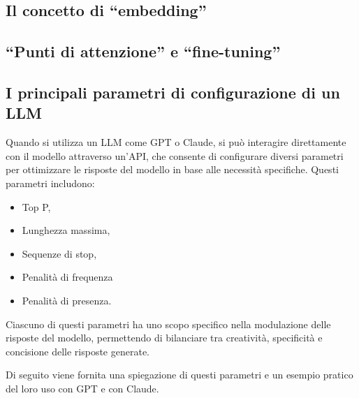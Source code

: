     \subsection{Il concetto di ``embedding''}
        
    \subsection{``Punti di attenzione'' e ``fine-tuning''}
    
    \subsection{I principali parametri di configurazione di un LLM}
        Quando si utilizza un LLM come GPT o Claude, si può interagire direttamente con il modello attraverso un'API, che consente di configurare diversi parametri per ottimizzare le risposte del modello in base alle necessità specifiche. Questi parametri includono: 
        \begin{itemize}
            \item Top P, 
            \item Lunghezza massima,  
            \item Sequenze di stop, 
            \item Penalità di frequenza 
            \item Penalità di presenza.
        \end{itemize}
        
        Ciascuno di questi parametri ha uno scopo specifico nella modulazione delle risposte del modello, permettendo di bilanciare tra creatività, specificità e concisione delle risposte generate.  
        
        Di seguito viene fornita una spiegazione di questi parametri e un esempio pratico del loro uso con GPT e con Claude. 
        
